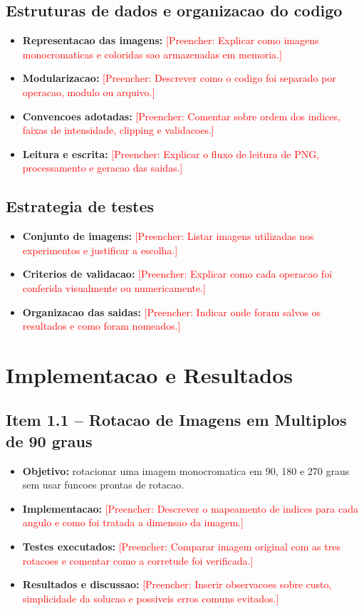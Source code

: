 \documentclass[12pt,a4paper]{article}
\newcommand{\placeholder}[1]{\textcolor{red}{[Preencher: #1]}}
\begin{document}
\subsection{Estruturas de dados e organizacao do codigo}

\begin{itemize}[leftmargin=*]
  \item \textbf{Representacao das imagens:} \placeholder{Explicar como imagens monocromaticas e coloridas sao armazenadas em memoria.}
  \item \textbf{Modularizacao:} \placeholder{Descrever como o codigo foi separado por operacao, modulo ou arquivo.}
  \item \textbf{Convencoes adotadas:} \placeholder{Comentar sobre ordem dos indices, faixas de intensidade, clipping e validacoes.}
  \item \textbf{Leitura e escrita:} \placeholder{Explicar o fluxo de leitura de PNG, processamento e geracao das saidas.}
\end{itemize}

\subsection{Estrategia de testes}

\begin{itemize}[leftmargin=*]
  \item \textbf{Conjunto de imagens:} \placeholder{Listar imagens utilizadas nos experimentos e justificar a escolha.}
  \item \textbf{Criterios de validacao:} \placeholder{Explicar como cada operacao foi conferida visualmente ou numericamente.}
  \item \textbf{Organizacao das saidas:} \placeholder{Indicar onde foram salvos os resultados e como foram nomeados.}
\end{itemize}

\section{Implementacao e Resultados}

\subsection{Item 1.1 -- Rotacao de Imagens em Multiplos de 90 graus}

\begin{itemize}[leftmargin=*]
  \item \textbf{Objetivo:} rotacionar uma imagem monocromatica em 90, 180 e 270 graus sem usar funcoes prontas de rotacao.
  \item \textbf{Implementacao:} \placeholder{Descrever o mapeamento de indices para cada angulo e como foi tratada a dimensao da imagem.}
  \item \textbf{Testes executados:} \placeholder{Comparar imagem original com as tres rotacoes e comentar como a corretude foi verificada.}
  \item \textbf{Resultados e discussao:} \placeholder{Inserir observacoes sobre custo, simplicidade da solucao e possiveis erros comuns evitados.}
\end{itemize}
\end{document}
